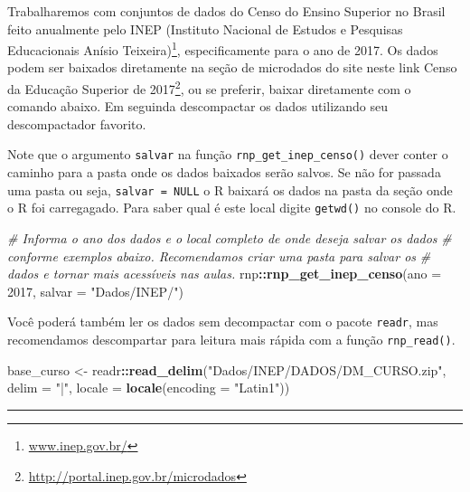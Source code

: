 \documentclass[12pt,]{style/krantz}
\makeatletter
\newenvironment{Shaded}{\begin{snugshade}}{\end{snugshade}}
\newcommand{\KeywordTok}[1]{\textcolor[rgb]{0.13,0.29,0.53}{\textbf{#1}}}
\newcommand{\DataTypeTok}[1]{\textcolor[rgb]{0.13,0.29,0.53}{#1}}
\newcommand{\DecValTok}[1]{\textcolor[rgb]{0.00,0.00,0.81}{#1}}
\newcommand{\StringTok}[1]{\textcolor[rgb]{0.31,0.60,0.02}{#1}}
\newcommand{\CommentTok}[1]{\textcolor[rgb]{0.56,0.35,0.01}{\textit{#1}}}
\newcommand{\OperatorTok}[1]{\textcolor[rgb]{0.81,0.36,0.00}{\textbf{#1}}}
\newcommand{\NormalTok}[1]{#1}
\renewenvironment{quote}{\begin{VF}}{\end{VF}}
\renewcommand{\href}[2]{#2\footnote{\url{#1}}}
\newenvironment{kframe}{%
\medskip{}
\setlength{\fboxsep}{.8em}
 \def\at@end@of@kframe{}%
 \ifinner\ifhmode%
  \def\at@end@of@kframe{\end{minipage}}%
  \begin{minipage}{\columnwidth}%
 \fi\fi%
 \def\FrameCommand##1{\hskip\@totalleftmargin \hskip-\fboxsep
 \colorbox{shadecolor}{##1}\hskip-\fboxsep
     \hskip-\linewidth \hskip-\@totalleftmargin \hskip\columnwidth}%
 \MakeFramed {\advance\hsize-\width
   \@totalleftmargin\z@ \linewidth\hsize
   \@setminipage}}%
 {\par\unskip\endMakeFramed%
 \at@end@of@kframe}
\renewenvironment{Shaded}{\begin{kframe}}{\end{kframe}}
\theoremstyle{definition}
\theoremstyle{definition}
\theoremstyle{definition}
\theoremstyle{remark}
\makeatother
\begin{document}
Trabalharemos com conjuntos de dados do Censo do Ensino Superior no
Brasil feito anualmente pelo \href{www.inep.gov.br/}{INEP (Instituto
Nacional de Estudos e Pesquisas Educacionais Anísio Teixeira)},
especificamente para o ano de 2017. Os dados podem ser baixados
diretamente na seção de microdados do site neste link
\href{http://portal.inep.gov.br/microdados}{Censo da Educação Superior
de 2017}, ou se preferir, baixar diretamente com o comando abaixo. Em
seguinda descompactar os dados utilizando seu descompactador favorito.

\begin{quote}
Note que o argumento \texttt{salvar} na função
\texttt{rnp\_get\_inep\_censo()} dever conter o caminho para a pasta
onde os dados baixados serão salvos. Se não for passada uma pasta ou
seja, \texttt{salvar\ =\ NULL} o R baixará os dados na pasta da seção
onde o R foi carregagado. Para saber qual é este local digite
\texttt{getwd()} no console do R.
\end{quote}

\begin{Shaded}
\begin{Highlighting}[]
\CommentTok{# Informa o ano dos dados e o local completo de onde deseja salvar os dados}
\CommentTok{# conforme exemplos abaixo. Recomendamos criar uma pasta para salvar os}
\CommentTok{# dados e tornar mais acessíveis nas aulas.}
\NormalTok{rnp}\OperatorTok{::}\KeywordTok{rnp_get_inep_censo}\NormalTok{(}\DataTypeTok{ano =} \DecValTok{2017}\NormalTok{, }\DataTypeTok{salvar =} \StringTok{"Dados/INEP/"}\NormalTok{)}
\end{Highlighting}
\end{Shaded}

Você poderá também ler os dados sem decompactar com o pacote
\texttt{readr}, mas recomendamos descompartar para leitura mais rápida
com a função \texttt{rnp\_read()}.

\begin{Shaded}
\begin{Highlighting}[]
\NormalTok{base_curso <-}\StringTok{ }\NormalTok{readr}\OperatorTok{::}\KeywordTok{read_delim}\NormalTok{(}\StringTok{"Dados/INEP/DADOS/DM_CURSO.zip"}\NormalTok{, }
                        \DataTypeTok{delim =} \StringTok{"|"}\NormalTok{, }\DataTypeTok{locale =} \KeywordTok{locale}\NormalTok{(}\DataTypeTok{encoding =} \StringTok{"Latin1"}\NormalTok{))}
\end{Highlighting}
\end{Shaded}

\begin{center}\rule{0.5\linewidth}{\linethickness}\end{center}
\end{document}
